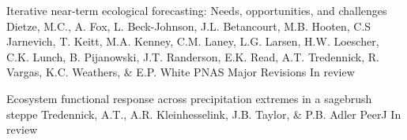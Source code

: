 

\begin{pubentries}


  \pubentry
    {Iterative near-term ecological forecasting: Needs, opportunities, and challenges} %
    {Dietze, M.C., A. Fox, L. Beck-Johnson, J.L. Betancourt, M.B. Hooten, C.S Jarnevich, T. Keitt, M.A. Kenney, C.M. Laney, L.G. Larsen, H.W. Loescher, C.K. Lunch, B. Pijanowski, J.T. Randerson, E.K. Read, A.T. Tredennick, R. Vargas, K.C. Weathers, \& E.P. White} %
    {PNAS} %
    {Major Revisions} %
    {In review} %

  \pubentry
    {Ecosystem functional response across precipitation extremes in a sagebrush steppe} %
    {Tredennick, A.T., A.R. Kleinhesselink, J.B. Taylor, \& P.B. Adler} %
    {PeerJ} %
    {} %
    {In review} %

\end{pubentries}
